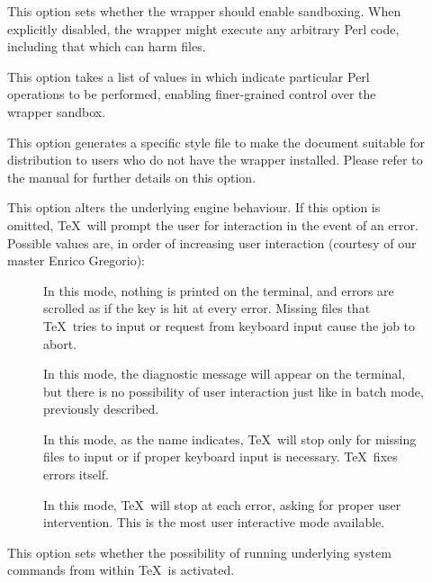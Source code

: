 \begin{description}
\begin{description}
\item[] This option sets whether the wrapper should enable sandboxing. When explicitly disabled, the wrapper might execute any arbitrary Perl code, including that which can harm files.

\item[] This option takes a list of values in which indicate particular Perl operations to be performed, enabling finer-grained control over the wrapper sandbox.

\item[]  This option generates a specific style file to make the document suitable for distribution to users who do not have the wrapper installed. Please refer to the manual for further details on this option.

\item[] This option alters the underlying engine behaviour. If this option is omitted, \TeX\ will prompt the user for interaction in the event of an error. Possible values are, in order of increasing user interaction (courtesy of our master Enrico Gregorio):

\begin{description}
\item[] In this mode, nothing is printed on the terminal, and errors are scrolled as if the  key is hit at every error. Missing files that \TeX\ tries to input or request from keyboard input cause the job to abort.

\item[] In this mode, the diagnostic message will appear on the terminal, but there is no possibility of user interaction just like in batch mode, previously described.

\item[] In this mode, as the name indicates, \TeX\ will stop only for missing files to input or if proper keyboard input is necessary. \TeX\ fixes errors itself.

\item[] In this mode, \TeX\ will stop at each error, asking for proper user intervention. This is the most user interactive mode available.
\end{description}

\item[] This option sets whether the possibility of running underlying system commands from within \TeX\ is activated.


\end{description}
\end{description}

